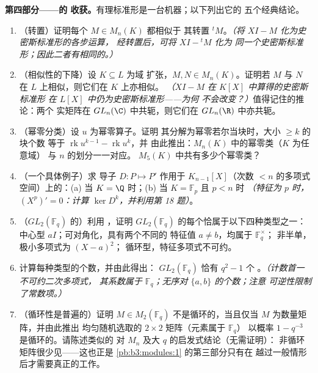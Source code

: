 \begin{problem}
\medskip
\noindent\textbf{第四部分——的
收获。}有理标准形是一台机器；以下列出它的
五个经典结论。
\begin{enumerate}[resume]
  \item （转置）证明每个 $M \in M_n(K)$ 都相似于
        其转置 ${}^tM$。\emph{（将 $XI - M$ 化为史密斯标准形的各步运算，
        经转置后，可将 $XI - {}^tM$ 化为
        同一个史密斯标准形；因此二者有相同的。）}
  \item （相似性的下降）设 $K \subseteq L$ 为域
        扩张，$M, N \in M_n(K)$。证明若 $M$ 与 $N$
        在 $L$ 上相似，则它们在 $K$ 上亦相似。
        \emph{（$XI - M$ 在 $K[X]$ 中算得的史密斯标准形
        在 $L[X]$ 中仍为史密斯标准形——为何
        不会改变？）}值得记住的推论：两个
        实矩阵在 $GL_n(\C)$ 中共轭，则它们在
        $GL_n(\R)$ 中亦共轭。
  \item （幂零分类）设 $u$ 为幂零算子。证明
        其分解为幂零若尔当块时，大小 $\geq k$ 的块个数
        等于
        $\operatorname{rk}u^{k-1} - \operatorname{rk}u^k$，并
        由此推出：$M_n(K)$ 中的幂零类（$K$ 为任意域）
        与 $n$ 的划分一一对应。
        $M_5(K)$ 中共有多少个幂零类？
  \item （一个具体例子）求
        导子 $D\colon P \mapsto P'$ 作用于
        $K_{n-1}[X]$（次数 $< n$ 的多项式空间）上的：(a) 当 $K =
        \Q$ 时；(b) 当 $K = \mathbb F_p$ 且 $p < n$ 时
        \emph{（特征为 $p$ 时，$(X^p)' = 0$：计算
        $\ker D^k$，并利用第 18 题）}。
  \item （$GL_2(\mathbb F_q)$ 的）利用
        ，证明
        $GL_2(\mathbb F_q)$ 的每个恰属于以下四种类型之一：
        中心型 $aI$；可对角化，具有两个不同的
        特征值 $a \neq b$，均属于 $\mathbb F_q^\times$；
        非半单，极小多项式为 $(X - a)^2$；
        循环型，特征多项式不可约。
  \item 计算每种类型的个数，并由此得出：
        $GL_2(\mathbb F_q)$ 恰有 $q^2 - 1$ 个
        。\emph{（计数首一不可约二次多项式，
        其系数属于 $\mathbb F_q$；无序对 $\{a, b\}$ 的个数；注意
        可逆性限制了常数项。）}
  \item （循环性是普遍的）证明 $M \in M_2(\mathbb F_q)$
        不是循环的，当且仅当 $M$ 为数量矩阵，并由此推出
        均匀随机选取的 $2\times2$ 矩阵（元素属于 $\mathbb F_q$）
        以概率 $1 - q^{-3}$ 是循环的。请陈述类似的
        对 $M_n$ 及大 $q$ 的启发式结论（无需证明）：
        非循环矩阵很少见——这也正是
        \cref{pb:b3:modules:1} 的第三部分只有在
        越过一般情形后才需要真正的工作。
\end{enumerate}


\end{problem}
